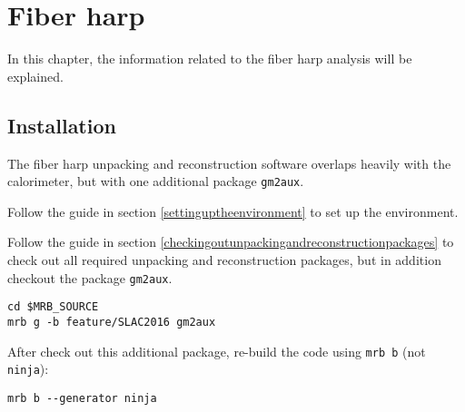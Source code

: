\chapter{Fiber harp}
\label{chap:fiberharp}

In this chapter, the information related to the fiber harp analysis will be explained.

\section{Installation}

The fiber harp unpacking and reconstruction software overlaps heavily with the calorimeter, but with one additional package \verb+gm2aux+.

\vspace{4mm}\par\noindent  Follow the guide in section \ref{settinguptheenvironment} to set up the environment.

\vspace{4mm}\par\noindent  Follow the guide in section \ref{checkingoutunpackingandreconstructionpackages} to check out all required unpacking and reconstruction packages, but in addition checkout the package \verb+gm2aux+.
%
\begin{Verbatim}[frame=single]
cd $MRB_SOURCE
mrb g -b feature/SLAC2016 gm2aux
\end{Verbatim}
%

\noindent After check out this additional package, re-build the code using \verb+mrb b+ (not \verb+ninja+):

%
\begin{Verbatim}[frame=single]
mrb b --generator ninja
\end{Verbatim}
%


